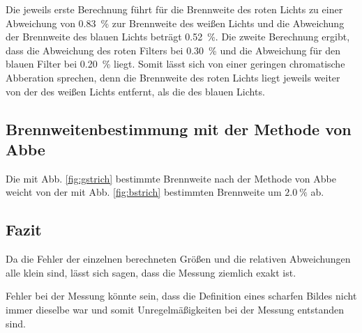 \noindent Die jeweils erste Berechnung führt für die Brennweite des roten Lichts zu einer Abweichung von \SI{0.83}{\percent} zur Brennweite des weißen Lichts und die Abweichung der Brennweite des blauen Lichts beträgt \SI{0.52}{\percent}. Die zweite Berechnung ergibt, dass die Abweichung des roten Filters bei \SI{0.30}{\percent} und die Abweichung für den blauen Filter bei \SI{0.20}{\percent} liegt. Somit lässt sich von einer geringen chromatische Abberation sprechen, denn die Brennweite des roten Lichts liegt jeweils weiter von der des weißen Lichts entfernt, als die des blauen Lichts. 

\subsection{Brennweitenbestimmung mit der Methode von Abbe}
Die mit Abb. \ref{fig:gstrich} bestimmte Brennweite nach der Methode von Abbe weicht von der mit Abb. \ref{fig:bstrich} bestimmten Brennweite um $\SI{2.0}{\percent}$ ab.

\subsection{Fazit}
Da die Fehler der einzelnen berechneten Größen und die relativen Abweichungen alle klein sind, lässt sich sagen, dass die Messung ziemlich exakt ist.

\noindent Fehler bei der Messung könnte sein, dass die Definition eines scharfen Bildes nicht immer dieselbe war und somit Unregelmäßigkeiten bei der Messung entstanden sind.
